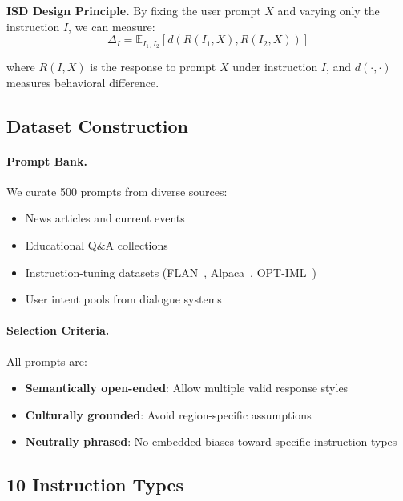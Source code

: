 \textbf{ISD Design Principle.} By fixing the user prompt $X$ and varying only the instruction $I$, we can measure:
\begin{equation}
\Delta_I = \mathbb{E}_{I_1, I_2}\left[ d\left( R(I_1, X), R(I_2, X) \right) \right]
\label{eq:isd_metric}
\end{equation}

where $R(I, X)$ is the response to prompt $X$ under instruction $I$, and $d(\cdot, \cdot)$ measures behavioral difference.

\vspace{-2mm}
\subsection{Dataset Construction}
\label{sec:isd_construction}

\paragraph{Prompt Bank.} We curate 500 prompts from diverse sources:
\begin{itemize}[leftmargin=*,itemsep=1pt]
    \item News articles and current events
    \item Educational Q\&A collections
    \item Instruction-tuning datasets (FLAN~\cite{wei2022finetuned}, Alpaca~\cite{taori2023alpaca}, OPT-IML~\cite{iyer2022optiml})
    \item User intent pools from dialogue systems
\end{itemize}

\paragraph{Selection Criteria.} All prompts are:
\begin{itemize}[leftmargin=*,itemsep=1pt]
    \item \textbf{Semantically open-ended}: Allow multiple valid response styles
    \item \textbf{Culturally grounded}: Avoid region-specific assumptions
    \item \textbf{Neutrally phrased}: No embedded biases toward specific instruction types
\end{itemize}

\vspace{-2mm}
\subsection{10 Instruction Types}
\label{sec:instruction_types}

